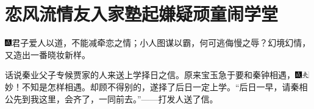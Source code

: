 

\chapter{恋风流情友入家塾\hspace{.5em}起嫌疑顽童闹学堂}

{\includegraphics[width=3mm]{../Images/00005}\kaishu 君子爱人以道，不能减牵恋之情；小人图谋以霸，何可逃侮慢之辱？幻境幻情，又造出一番晓妆新样。}

话说秦业父子专候贾家的人来送上学择日之信。原来宝玉急于要和秦钟相遇，{\includegraphics[width=3mm]{../Images/00005}\includegraphics[width=3mm]{../Images/00012}\footnotesize \kaishu 妙！不知是怎样相遇。}却顾不得别的，遂择了后日一定上学。“后日一早，请秦相公先到我这里，会齐了，一同前去。”------打发人送了信。

